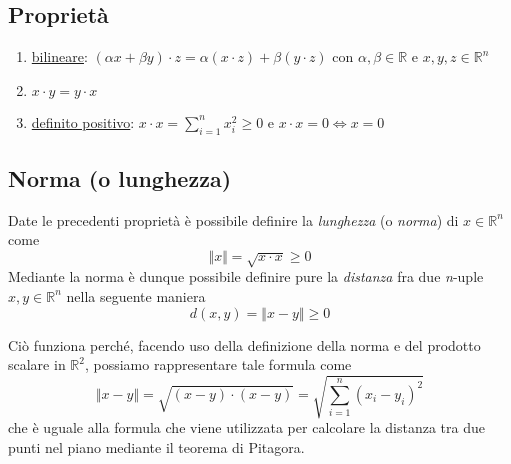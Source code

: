 		\subsection{Proprietà}
			\begin{enumerate}
				\item \underline{bilineare}: $ (\alpha x + \beta y) \cdot z = \alpha (x \cdot z) + \beta (y \cdot z)  $ con $ \alpha, \beta \in \mathbb{R} $ e $ x, y, z \in \mathbb{R}^n $
				\item $ x \cdot y = y \cdot x $
				\item \underline{definito positivo}: $ x \cdot x = \sum_{i=1}^n x^2_i \geq 0 $ e $ x \cdot x = 0 \iff x = 0 $
			\end{enumerate}
		
		\subsection{Norma (o lunghezza)}
			Date le precedenti proprietà è possibile definire la \textit{lunghezza} (o \textit{norma}) di $ x \in \mathbb{R}^n $ come
			$$ \Vert x \Vert = \sqrt{x \cdot x} \geq 0 $$
			Mediante la norma è dunque possibile definire pure la \textit{distanza} fra due \textit{n}-uple $x, y \in \mathbb{R}^n$ nella seguente maniera
			$$ d(x, y) = \Vert x - y \Vert \geq 0 $$
			\begin{GrayBox}
				Ciò funziona perché, facendo uso della definizione della norma e del prodotto scalare in $\mathbb{R}^2$, possiamo rappresentare tale formula come
				$$ \Vert x - y \Vert = \sqrt{(x - y)\cdot(x - y)} = \sqrt{\sum_{i=1}^{n}(x_i - y_i)^2} $$
				che è uguale alla formula che viene utilizzata per calcolare la distanza tra due punti nel piano mediante il teorema di Pitagora.
			\end{GrayBox}
		
